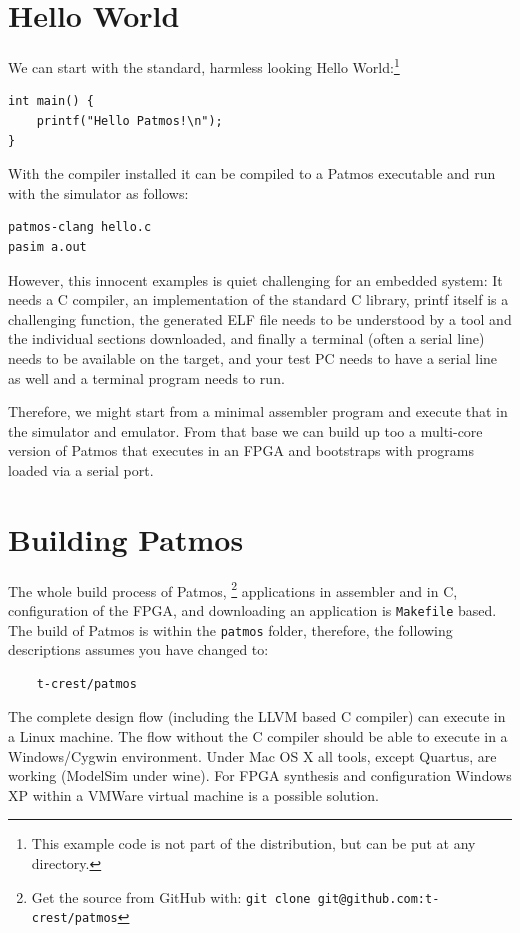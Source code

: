 \documentclass[a4paper,fontsize=10pt,twoside,DIV15,BCOR12mm,headinclude=true,footinclude=false,pagesize,bibtotoc]{scrbook}
\newcommand{\code}[1]{{\texttt{#1}}}
\begin{document}
\section{Hello World}

We can start with the standard, harmless looking Hello
World:\footnote{This example code is not part of the distribution, but
can be put at any directory.}
\begin{lstlisting}
int main() {
    printf("Hello Patmos!\n");
}
\end{lstlisting}

With the compiler installed it can be compiled to a Patmos executable
and run with the simulator as follows:

\begin{verbatim}
patmos-clang hello.c
pasim a.out
\end{verbatim}

However, this innocent examples is quiet challenging for an embedded system:
It needs a C compiler, an implementation of the standard C library, printf
itself is a challenging function, the generated ELF file needs to be understood
by a tool and the individual sections downloaded, and finally a terminal (often
a serial line) needs to be available on the target, and your test PC needs to
have a serial line as well and a terminal program needs to run.

Therefore, we might start from a minimal assembler program and execute
that in the simulator and emulator. From that base we can build up too
a multi-core version of Patmos that executes in an FPGA and bootstraps
with programs loaded via a serial port.


\section{Building Patmos}

The whole build process of Patmos,%
\footnote{Get the source from GitHub with: \code{git clone git@github.com:t-crest/patmos}}
applications in assembler
and in C, configuration of the FPGA, and downloading an application
is \code{Makefile} based. The build of Patmos is within the \code{patmos} folder,
therefore, the following descriptions assumes you have changed to:

\begin{verbatim}
    t-crest/patmos
\end{verbatim}


The complete design flow (including the LLVM
based C compiler) can execute in a Linux machine. The flow without
the C compiler should be able to execute in a Windows/Cygwin environment.
Under Mac OS X all tools, except Quartus, are working (ModelSim under
wine). For FPGA synthesis and configuration Windows XP within a VMWare
virtual machine is a possible solution.
\end{document}
